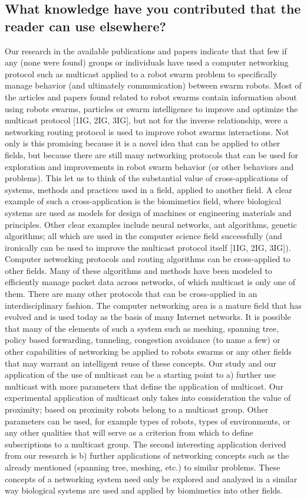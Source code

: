 \documentclass[journal]{IEEEtran}
\begin{document}
\begin{itemize}
\subsection{What knowledge have you contributed that the reader can use elsewhere?}
Our research in the available publications and papers indicate that that few if any (none were found) groups or individuals have used a computer networking protocol such as multicast applied to a robot swarm problem to specifically manage behavior (and ultimately communication) between swarm robots.
Most of the articles and papers found related to robot swarms contain information about using robots swarms, particles or swarm intelligence to improve and optimize the multicast protocol [1IG, 2IG, 3IG], but not for the inverse relationship, were a networking routing protocol is used to improve robot swarms interactions. 
Not only is this promising because it is a novel idea that can be applied to other fields, but because there are still many networking protocols that can be used for exploration and improvements in robot swarm behavior (or other behaviors and problems). 
This let us to think of the substantial value of cross-applications of systems, methods and practices used in a field, applied to another field. A clear example of such a cross-application is the biomimetics field, where biological systems are used as models for design of machines or engineering materials and principles. Other clear examples include neural networks, ant algorithms, genetic algorithms; all which are used in the computer science field successfully (and ironically can be used to improve the multicast protocol itself [1IG, 2IG, 3IG]). 
Computer networking protocols and routing algorithms can be cross-applied to other fields. Many of these algorithms and methods have been modeled to efficiently manage packet data across networks, of which multicast is only one of them.  There are many other protocols that can be cross-applied in an interdisciplinary fashion. The computer networking area is a mature field that has evolved and is used today as the basis of many Internet networks. It is possible that many of the elements of such a system such as meshing, spanning tree, policy based forwarding, tunneling, congestion avoidance (to name a few) or other capabilities of networking be applied to robots swarms or any other fields that may warrant an intelligent reuse of these concepts.  Our study and our application of the use of multicast can be a starting point to a) further use multicast with more parameters that define the application of multicast. Our experimental application of multicast only takes into consideration the value of proximity; based on proximity robots belong to a multicast group. Other parameters can be used, for example types of robots, types of environments, or any other qualities that will serve as a criterion from which to define subscriptions to a multicast group. The second interesting application derived from our research is b) further applications of networking concepts such as the already mentioned (spanning tree, meshing, etc.) to similar problems. These concepts of a networking system need only be explored and analyzed in a similar way biological systems are used and applied by biomimetics into other fields. 

\end{itemize}
\end{document}
